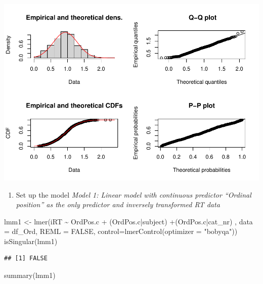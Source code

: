 \documentclass[
]{article}
\newenvironment{Shaded}{\begin{snugshade}}{\end{snugshade}}
\newcommand{\AttributeTok}[1]{\textcolor[rgb]{0.77,0.63,0.00}{#1}}
\newcommand{\ConstantTok}[1]{\textcolor[rgb]{0.00,0.00,0.00}{#1}}
\newcommand{\FunctionTok}[1]{\textcolor[rgb]{0.00,0.00,0.00}{#1}}
\newcommand{\NormalTok}[1]{#1}
\newcommand{\OtherTok}[1]{\textcolor[rgb]{0.56,0.35,0.01}{#1}}
\newcommand{\SpecialCharTok}[1]{\textcolor[rgb]{0.00,0.00,0.00}{#1}}
\newcommand{\StringTok}[1]{\textcolor[rgb]{0.31,0.60,0.02}{#1}}
\providecommand{\tightlist}{%
  \setlength{\itemsep}{0pt}\setlength{\parskip}{0pt}}
\begin{document}
\includegraphics{01_CSI_online_aphasia_power_analysis_summary_files/figure-latex/RT distributions-3.pdf}

\begin{enumerate}
\def\labelenumi{\alph{enumi})}
\setcounter{enumi}{2}
\tightlist
\item
  Set up the model \emph{Model 1: Linear model with continuous predictor
  ``Ordinal position'' as the only predictor and inversely transformed
  RT data}
\end{enumerate}

\begin{Shaded}
\begin{Highlighting}[]
\NormalTok{lmm1 }\OtherTok{\textless{}{-}} \FunctionTok{lmer}\NormalTok{(iRT }\SpecialCharTok{\textasciitilde{}}\NormalTok{ OrdPos.c }\SpecialCharTok{+} 
\NormalTok{               (OrdPos.c}\SpecialCharTok{|}\NormalTok{subject) }\SpecialCharTok{+}\NormalTok{(OrdPos.c}\SpecialCharTok{|}\NormalTok{cat\_nr) ,}
            \AttributeTok{data =}\NormalTok{ df\_Ord, }\AttributeTok{REML =} \ConstantTok{FALSE}\NormalTok{,}
            \AttributeTok{control=}\FunctionTok{lmerControl}\NormalTok{(}\AttributeTok{optimizer =} \StringTok{"bobyqa"}\NormalTok{))}
\FunctionTok{isSingular}\NormalTok{(lmm1)}
\end{Highlighting}
\end{Shaded}

\begin{verbatim}
## [1] FALSE
\end{verbatim}

\begin{Shaded}
\begin{Highlighting}[]
\FunctionTok{summary}\NormalTok{(lmm1)}
\end{Highlighting}
\end{Shaded}
\end{document}
